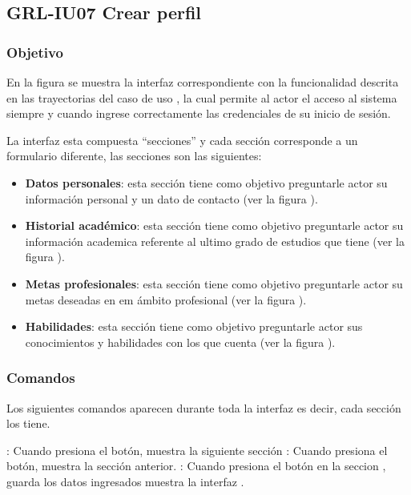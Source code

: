\clearpage
\subsection{GRL-IU07 Crear perfil}

\subsubsection{Objetivo}
En la figura  se muestra la interfaz correspondiente con la funcionalidad descrita en las
trayectorias del caso de uso  , la cual permite al actor el acceso al sistema
siempre y cuando ingrese correctamente las credenciales de su inicio de sesión.

La interfaz esta compuesta ``secciones'' y cada sección corresponde a un formulario diferente, las secciones
son las siguientes:
\begin{itemize}
   \item \textbf{Datos personales}: esta sección tiene como objetivo preguntarle actor su información
   personal y un dato de contacto (ver la figura ).
   \item \textbf{Historial académico}: esta sección tiene como objetivo preguntarle actor su información
   academica referente al ultimo grado de estudios que tiene (ver la figura ).
   \item \textbf{Metas profesionales}: esta sección tiene como objetivo preguntarle actor su metas deseadas
   en em ámbito profesional (ver la figura ).
   \item \textbf{Habilidades}: esta sección tiene como objetivo preguntarle actor sus conocimientos
   y habilidades con los que cuenta (ver la figura ).
\end{itemize}

\subsubsection{Comandos}
Los siguientes comandos aparecen durante toda la interfaz es decir, cada sección los tiene.


\Titem {} : Cuando presiona el botón, muestra la siguiente sección %
\Titem {} : Cuando presiona el botón, muestra la sección anterior.%
\Titem {} : Cuando presiona el botón en la seccion  , guarda los datos ingresados muestra la interfaz .



\clearpage
